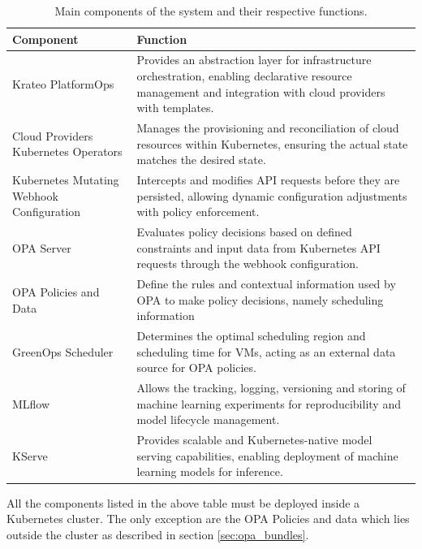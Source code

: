 \begin{table}[H]
  \centering
  \renewcommand{\arraystretch}{1.3} %
  \begin{tabularx}{\textwidth}{| l | X |} %
    \hline
    \textbf{Component} & \textbf{Function} \\
    \hline
    Krateo PlatformOps & Provides an abstraction layer for infrastructure orchestration, enabling declarative resource management and integration with cloud providers with templates. \\
    \hline
    Cloud Providers Kubernetes Operators & Manages the provisioning and reconciliation of cloud resources within Kubernetes, ensuring the actual state matches the desired state. \\
    \hline
    Kubernetes Mutating Webhook Configuration & Intercepts and modifies API requests before they are persisted, allowing dynamic configuration adjustments with policy enforcement. \\
    \hline
    OPA Server & Evaluates policy decisions based on defined constraints and input data from Kubernetes API requests through the webhook configuration. \\
    \hline
    OPA Policies and Data & Define the rules and contextual information used by OPA to make policy decisions, namely scheduling information \\
    \hline
    GreenOps Scheduler & Determines the optimal scheduling region and scheduling time for VMs, acting as an external data source for OPA policies. \\
    \hline
    MLflow & Allows the tracking, logging, versioning and storing of machine learning experiments for reproducibility and model lifecycle management. \\
    \hline
    KServe & Provides scalable and Kubernetes-native model serving capabilities, enabling deployment of machine learning models for inference. \\
    \hline
  \end{tabularx}
  \caption{Main components of the system and their respective functions.}
  \label{tab:system_components}
\end{table}

All the components listed in the above table must be deployed inside a Kubernetes cluster. The only exception are the OPA Policies and data which lies outside the cluster as described in section \ref{sec:opa_bundles}.

\newpage


